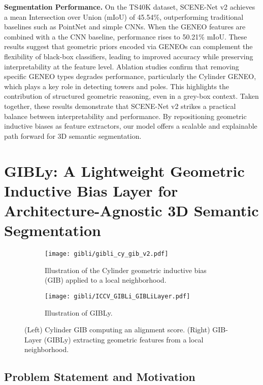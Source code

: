 \textbf{Segmentation Performance.} \;
On the TS40K dataset, SCENE-Net v2 achieves a mean Intersection over Union
(mIoU) of 45.54\%, outperforming traditional baselines such as PointNet and
simple CNNs. When the GENEO features are combined with a the
CNN baseline, performance rises to 50.21\% mIoU. These results suggest that
geometric priors encoded via GENEOs can complement the flexibility of black-box
classifiers, leading to improved accuracy while preserving interpretability at
the feature level.
%
Ablation studies confirm that removing specific GENEO types degrades
performance, particularly the Cylinder GENEO, which plays a key role in
detecting towers and poles. This highlights the contribution of structured
geometric reasoning, even in a grey-box context.
%
Taken together, these results demonstrate that SCENE-Net v2 strikes a practical
balance between interpretability and performance. By repositioning geometric
inductive biases as feature extractors, our model offers a scalable and
explainable path forward for 3D semantic segmentation.

\section{GIBLy: A Lightweight Geometric Inductive Bias Layer for Architecture-Agnostic 3D Semantic Segmentation}\label{sec:gibli}

\begin{figure}[ht]
      \centering
      \begin{subfigure}[t]{0.48\columnwidth}
            \centering
            \texttt{[image: gibli/gibli\_cy\_gib\_v2.pdf]}
            \caption{Illustration of the Cylinder geometric inductive bias (GIB) applied to a local neighborhood.}
            \label{fig:gib_cy}
      \end{subfigure}
      \hfill
      \begin{subfigure}[t]{0.48\columnwidth}
            \centering
            \texttt{[image: gibli/ICCV\_GIBLi\_GIBLiLayer.pdf]}
            \caption{Illustration of GIBLy.}
            \label{fig:gibli-layer}
      \end{subfigure}
      \caption[GIBLi Overview]{(Left) Cylinder GIB computing an alignment score. 
      (Right) GIB-Layer (GIBLy) extracting geometric features from a local neighborhood.}
      \label{fig:gib_pair}
\end{figure}

\subsection{Problem Statement and Motivation}

